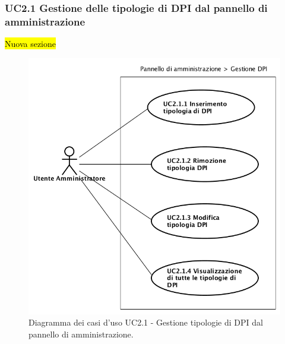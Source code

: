 		\subsubsection{UC2.1 Gestione delle tipologie di DPI dal pannello di amministrazione }
			\label{section:UC2_1}
			\hl{Nuova sezione}
			\begin{figure}[H]
				\begin{center}
					\includegraphics[width=12cm]{Pics/UC2_1GestioneDispositiviDiProtezioneIndividualeDaPannelloDiAmministrazione.png}
					\caption{
						Diagramma dei casi d'uso UC2.1 - Gestione tipologie di DPI dal pannello di amministrazione.}
					\label{fig:UC2_1GestioneDPIAmministrazione}
				\end{center}
			\end{figure}
